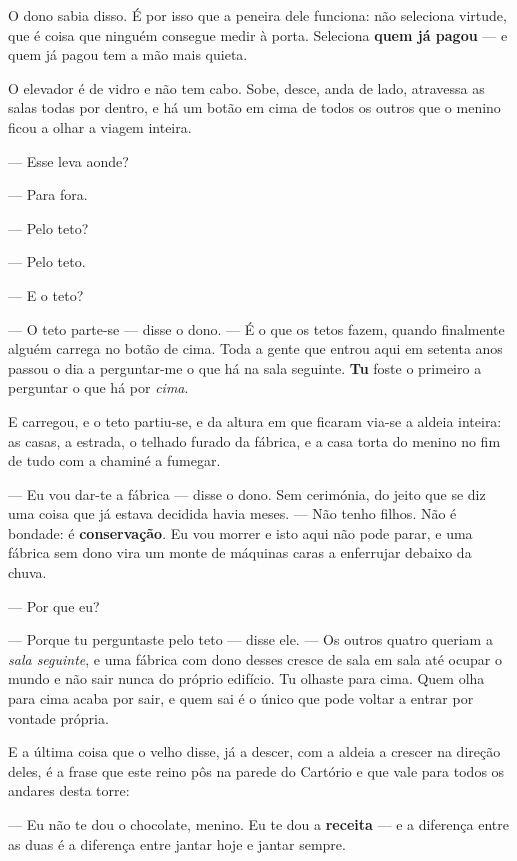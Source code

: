 \documentclass[livro.tex]{subfiles}
\begin{document}
O dono sabia disso. É por isso que a peneira dele funciona: não seleciona virtude, que é
coisa que ninguém consegue medir à porta. Seleciona \textbf{quem já pagou} --- e quem já
pagou tem a mão mais quieta.

\medskip

O elevador é de vidro e não tem cabo. Sobe, desce, anda de lado, atravessa as salas todas
por dentro, e há um botão em cima de todos os outros que o menino ficou a olhar a viagem
inteira.

--- Esse leva aonde?

--- Para fora.

--- Pelo teto?

--- Pelo teto.

--- E o teto?

--- O teto parte-se --- disse o dono. --- É o que os tetos fazem, quando finalmente
alguém carrega no botão de cima. Toda a gente que entrou aqui em setenta anos passou o dia
a perguntar-me o que há na sala seguinte. \textbf{Tu} foste o primeiro a perguntar o que
há por \emph{cima}.

\medskip

E carregou, e o teto partiu-se, e da altura em que ficaram via-se a aldeia inteira: as
casas, a estrada, o telhado furado da fábrica, e a casa torta do menino no fim de tudo com
a chaminé a fumegar.

--- Eu vou dar-te a fábrica --- disse o dono. Sem cerimónia, do jeito que se diz uma coisa
que já estava decidida havia meses. --- Não tenho filhos. Não é bondade: é
\textbf{conservação}. Eu vou morrer e isto aqui não pode parar, e uma fábrica sem dono
vira um monte de máquinas caras a enferrujar debaixo da chuva.

--- Por que eu?

--- Porque tu perguntaste pelo teto --- disse ele. --- Os outros quatro queriam a
\emph{sala seguinte}, e uma fábrica com dono desses cresce de sala em sala até ocupar o
mundo e não sair nunca do próprio edifício. Tu olhaste para cima. Quem olha para cima
acaba por sair, e quem sai é o único que pode voltar a entrar por vontade própria.

\medskip

E a última coisa que o velho disse, já a descer, com a aldeia a crescer na direção deles,
é a frase que este reino pôs na parede do Cartório e que vale para todos os andares desta
torre:

--- Eu não te dou o chocolate, menino. Eu te dou a \textbf{receita} --- e a diferença
entre as duas é a diferença entre jantar hoje e jantar sempre.
\end{document}
